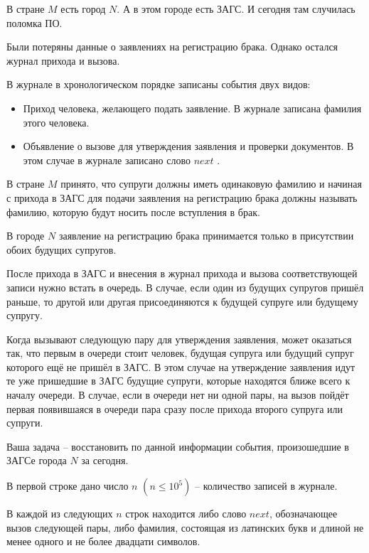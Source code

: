 
В стране $M$ есть город $N$. А в этом городе есть ЗАГС. И сегодня там случилась поломка ПО.

Были потеряны данные о заявлениях на регистрацию брака. Однако остался журнал прихода и вызова.

В журнале в хронологическом порядке записаны события двух видов:

\begin{itemize}
\item Приход человека, желающего подать заявление. В журнале записана фамилия этого человека.
\item Объявление о вызове для утверждения заявления и проверки документов. В этом случае в журнале записано слово $next$ .
\end{itemize}

В стране $M$ принято, что супруги должны иметь одинаковую фамилию и начиная с прихода в ЗАГС для подачи заявления на регистрацию брака должны называть фамилию, которую будут носить после вступления в брак.

В городе $N$ заявление на регистрацию брака принимается только в присутствии обоих будущих супругов.

После прихода в ЗАГС и внесения в журнал прихода и вызова соответствующей записи нужно встать в очередь. В случае, если один из будущих супругов пришёл раньше, то другой или другая присоединяются к будущей супруге или будущему супругу.

Когда вызывают следующую пару для утверждения заявления, может оказаться так, что первым в очереди стоит человек, будущая супруга или будущий супруг которого ещё не пришёл в ЗАГС. В этом случае на утверждение заявления идут те уже пришедшие в ЗАГС будущие супруги, которые находятся ближе всего к началу очереди. В случае, если в очереди нет ни одной пары, на вызов пойдёт первая появившаяся в очереди пара сразу после прихода второго супруга или супруги.

Ваша задача -- восстановить по данной информации события, произошедшие в ЗАГСе города $N$ за сегодня.


В первой строке дано число $n$ $(n \le 10^{5})$ -- количество записей в журнале.

В каждой из следующих $n$ строк находится либо слово $next$,
обозначающее вызов следующей пары, либо фамилия,
состоящая из латинских букв и длиной не менее одного и не более двадцати символов.

